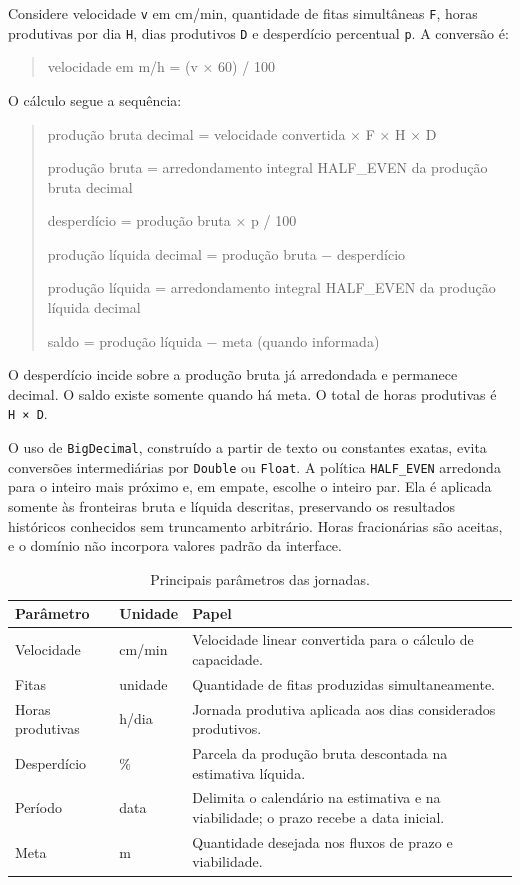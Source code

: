 \documentclass[12pt]{article}
\begin{document}
Considere velocidade \texttt{v} em cm/min, quantidade de fitas simultâneas \texttt{F}, horas produtivas por dia \texttt{H}, dias produtivos \texttt{D} e desperdício percentual \texttt{p}. A conversão é:

\begin{quote}\raggedright
velocidade em m/h = (v × 60) / 100
\end{quote}

O cálculo segue a sequência:

\begin{quote}\raggedright
produção bruta decimal = velocidade convertida × F × H × D

produção bruta = arredondamento integral HALF\_EVEN da produção bruta decimal

desperdício = produção bruta × p / 100

produção líquida decimal = produção bruta − desperdício

produção líquida = arredondamento integral HALF\_EVEN da produção líquida decimal

saldo = produção líquida − meta (quando informada)
\end{quote}

O desperdício incide sobre a produção bruta já arredondada e permanece decimal. O saldo existe somente quando há meta. O total de horas produtivas é \texttt{H\ ×\ D}.

O uso de \texttt{BigDecimal}, construído a partir de texto ou constantes exatas, evita conversões intermediárias por \texttt{Double} ou \texttt{Float}. A política \texttt{HALF\_EVEN} arredonda para o inteiro mais próximo e, em empate, escolhe o inteiro par. Ela é aplicada somente às fronteiras bruta e líquida descritas, preservando os resultados históricos conhecidos sem truncamento arbitrário. Horas fracionárias são aceitas, e o domínio não incorpora valores padrão da interface.

\begin{table}[htbp]
\centering
\caption{Principais parâmetros das jornadas.}
\begin{tabularx}{\textwidth}{@{}>{\raggedright\arraybackslash}p{} >{\raggedright\arraybackslash}p{} >{\raggedright\arraybackslash}X@{}}
\toprule
Parâmetro & Unidade & Papel \\
\midrule
Velocidade & cm/min & Velocidade linear convertida para o cálculo de capacidade. \\
Fitas & unidade & Quantidade de fitas produzidas simultaneamente. \\
Horas produtivas & h/dia & Jornada produtiva aplicada aos dias considerados produtivos. \\
Desperdício & \% & Parcela da produção bruta descontada na estimativa líquida. \\
Período & data & Delimita o calendário na estimativa e na viabilidade; o prazo recebe a data inicial. \\
Meta & m & Quantidade desejada nos fluxos de prazo e viabilidade. \\
\bottomrule
\end{tabularx}
\end{table}
\end{document}
